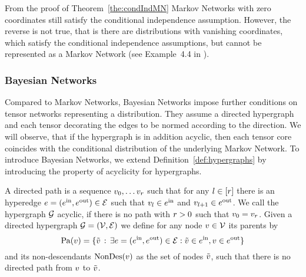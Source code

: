 From the proof of Theorem~\ref{the:condIndMN} Markov Networks with zero coordinates still satisfy the conditional independence assumption.
However, the reverse is not true, that is there are distributions with vanishing coordinates, which satisfy the conditional independence assumptions, but cannot be represented as a Markov Network (see Example~4.4 in \cite{koller_probabilistic_2009}).




\subsubsection{Bayesian Networks}

Compared to Markov Networks, Bayesian Networks impose further conditions on tensor networks representing a distribution.
They assume a directed hypergraph and each tensor decorating the edges to be normed according to the direction.
We will observe, that if the hypergraph is in addition acyclic, then each tensor core coincides with the conditional distribution of the underlying Markov Network.
To introduce Bayesian Networks, we extend Definition~\ref{def:hypergraphs} by introducing the property of acyclicity for hypergraphs.


\begin{definition}
	A directed path is a sequence $v_{0},\ldots v_{r}$ such that for any $l\in[r]$ there is an hyperedge $e=(e^{\mathrm{in}},e^{\mathrm{out}})\in\mathcal{E}$ such that $v_{l}\in e^{\mathrm{in}}$ and $v_{l+1}\in e^{\mathrm{out}}$.
	We call the hypergraph $\mathcal{G}$ acyclic, if there is no path with $r>0$ such that $v_{0}=v_{r}$.
	Given a directed hypergraph $\mathcal{G}=(\mathcal{V},\mathcal{E})$ we define for any node $v\in\mathcal{V}$ its parents by
		\[ \mathrm{Pa}(v) = \{\tilde{v} \, : \, \exists e=(e^{\mathrm{in}},e^{\mathrm{out}})\in\mathcal{E}: \tilde{v}\in e^{\mathrm{in}},v\in e^{\mathrm{out}} \} \]
	and its non-descendants $\mathrm{NonDes}(v)$ as the set of nodes $\tilde{v}$, such that there is no directed path from $v$ to $\tilde{v}$.
\end{definition}

